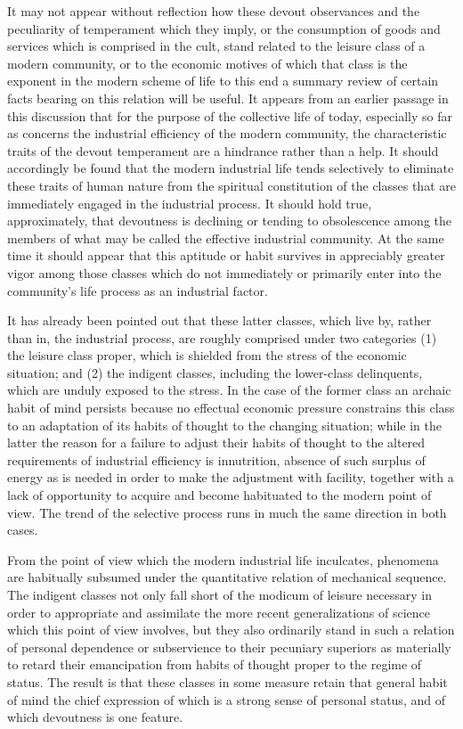 \documentclass[12pt]{report}
\begin{document}
It may not appear without reflection how these devout observances and
the peculiarity of temperament which they imply, or the consumption of
goods and services which is comprised in the cult, stand related to the
leisure class of a modern community, or to the economic motives of which
that class is the exponent in the modern scheme of life to this end a
summary review of certain facts bearing on this relation will be useful.
It appears from an earlier passage in this discussion that for the
purpose of the collective life of today, especially so far as concerns
the industrial efficiency of the modern community, the characteristic
traits of the devout temperament are a hindrance rather than a help.
It should accordingly be found that the modern industrial life tends
selectively to eliminate these traits of human nature from the spiritual
constitution of the classes that are immediately engaged in the
industrial process. It should hold true, approximately, that devoutness
is declining or tending to obsolescence among the members of what may
be called the effective industrial community. At the same time it should
appear that this aptitude or habit survives in appreciably greater vigor
among those classes which do not immediately or primarily enter into the
community's life process as an industrial factor.

It has already been pointed out that these latter classes, which live
by, rather than in, the industrial process, are roughly comprised under
two categories (1) the leisure class proper, which is shielded from
the stress of the economic situation; and (2) the indigent classes,
including the lower-class delinquents, which are unduly exposed to
the stress. In the case of the former class an archaic habit of mind
persists because no effectual economic pressure constrains this class to
an adaptation of its habits of thought to the changing situation; while
in the latter the reason for a failure to adjust their habits of thought
to the altered requirements of industrial efficiency is innutrition,
absence of such surplus of energy as is needed in order to make the
adjustment with facility, together with a lack of opportunity to acquire
and become habituated to the modern point of view. The trend of the
selective process runs in much the same direction in both cases.

From the point of view which the modern industrial life inculcates,
phenomena are habitually subsumed under the quantitative relation of
mechanical sequence. The indigent classes not only fall short of the
modicum of leisure necessary in order to appropriate and assimilate
the more recent generalizations of science which this point of view
involves, but they also ordinarily stand in such a relation of personal
dependence or subservience to their pecuniary superiors as materially to
retard their emancipation from habits of thought proper to the regime
of status. The result is that these classes in some measure retain that
general habit of mind the chief expression of which is a strong sense of
personal status, and of which devoutness is one feature.
\end{document}
